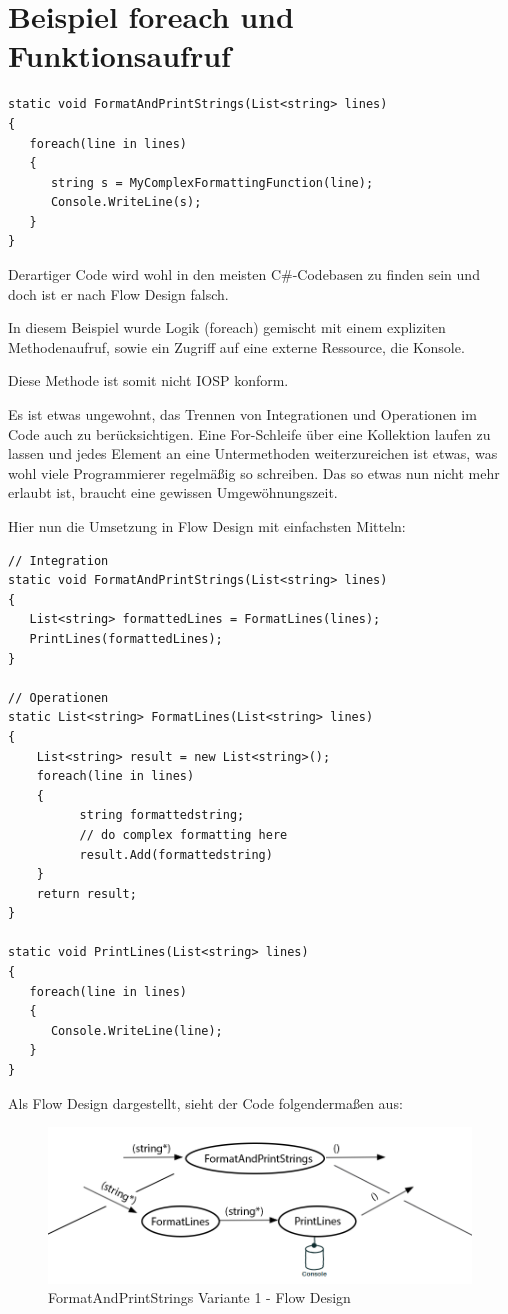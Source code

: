 \section{Beispiel foreach und Funktionsaufruf}




\begin{lstlisting}[caption=FormatAndPrintStrings nicht IOSP-konfrom]
static void FormatAndPrintStrings(List<string> lines)
{
   foreach(line in lines)
   {
      string s = MyComplexFormattingFunction(line);
      Console.WriteLine(s);
   }
}
\end{lstlisting}
Derartiger Code wird wohl in den meisten C\#-Codebasen zu finden sein und doch ist er nach Flow Design falsch.

In diesem Beispiel wurde Logik (foreach) gemischt mit einem expliziten
Methodenaufruf, sowie ein Zugriff auf eine externe Ressource, die
Konsole.

Diese Methode ist somit nicht IOSP konform.

Es ist etwas ungewohnt, das Trennen von Integrationen und Operationen im Code auch zu berücksichtigen.
Eine For-Schleife über eine Kollektion laufen zu lassen und jedes Element an eine Untermethoden weiterzureichen ist etwas,
was wohl viele Programmierer regelmäßig so schreiben.
Das so etwas nun nicht mehr erlaubt ist, braucht eine gewissen Umgewöhnungszeit.

\bigskip

Hier nun die Umsetzung in Flow Design mit einfachsten Mitteln:
\\
\begin{lstlisting}[caption=FormatAndPrintStrings Variante 1]
// Integration
static void FormatAndPrintStrings(List<string> lines)
{
   List<string> formattedLines = FormatLines(lines);
   PrintLines(formattedLines);
}

// Operationen
static List<string> FormatLines(List<string> lines)
{
    List<string> result = new List<string>();
    foreach(line in lines)
    {
          string formattedstring;
          // do complex formatting here
          result.Add(formattedstring)
    }
    return result;
}

static void PrintLines(List<string> lines)
{
   foreach(line in lines)
   {
      Console.WriteLine(line);
   }
}
\end{lstlisting}


Als Flow Design dargestellt, sieht der Code folgendermaßen aus:
\begin{figure}[H]
	\centering
	\includegraphics[width=1\linewidth]{./img/flowForeach1.png}
	\caption{FormatAndPrintStrings Variante 1 - Flow Design}
\end{figure}


